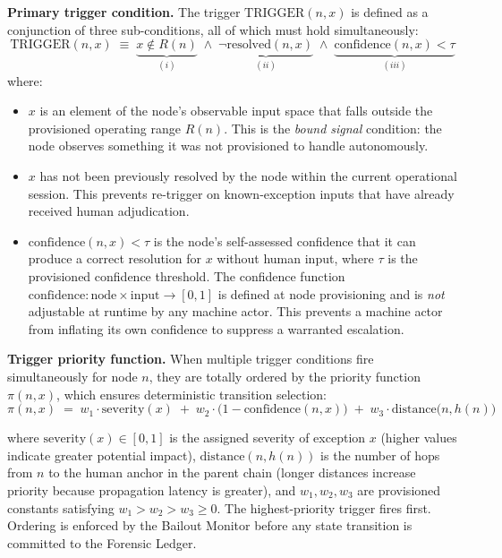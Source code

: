 \bigskip
\noindent\textbf{Primary trigger condition.} The trigger $\text{TRIGGER}(n, x)$ is defined as a conjunction of three sub-conditions, all of which must hold simultaneously:
\begin{equation}
\text{TRIGGER}(n, x) \;\equiv\; \underbrace{x \notin R(n)}_{(i)} \;\land\; \underbrace{\neg\text{resolved}(n, x)}_{(ii)} \;\land\; \underbrace{\text{confidence}(n, x) < \tau}_{(iii)} \tag{TC}
\end{equation}
where:

\begin{itemize}\itemsep=0pt
\item[(i)] $x$ is an element of the node's observable input space that falls outside the provisioned operating range $R(n)$. This is the \emph{bound signal} condition: the node observes something it was not provisioned to handle autonomously.

\item[(ii)] $x$ has not been previously resolved by the node within the current operational session. This prevents re-trigger on known-exception inputs that have already received human adjudication.

\item[(iii)] $\text{confidence}(n, x) < \tau$ is the node's self-assessed confidence that it can produce a correct resolution for $x$ without human input, where $\tau$ is the provisioned confidence threshold. The confidence function $\text{confidence} : \text{node} \times \text{input} \rightarrow [0, 1]$ is defined at node provisioning and is \emph{not} adjustable at runtime by any machine actor. This prevents a machine actor from inflating its own confidence to suppress a warranted escalation.
\end{itemize}

\bigskip
\noindent\textbf{Trigger priority function.} When multiple trigger conditions fire simultaneously for node $n$, they are totally ordered by the priority function $\pi(n, x)$, which ensures deterministic transition selection:
\begin{equation}
\pi(n, x) \;=\; w_1 \cdot \text{severity}(x) \;+\; w_2 \cdot \bigl(1 - \text{confidence}(n, x)\bigr) \;+\; w_3 \cdot \text{distance}\bigl(n, h(n)\bigr) \tag{PF}
\end{equation}

where $\text{severity}(x) \in [0, 1]$ is the assigned severity of exception $x$ (higher values indicate greater potential impact), $\text{distance}(n, h(n))$ is the number of hops from $n$ to the human anchor in the parent chain (longer distances increase priority because propagation latency is greater), and $w_1, w_2, w_3$ are provisioned constants satisfying $w_1 > w_2 > w_3 \geq 0$. The highest-priority trigger fires first. Ordering is enforced by the Bailout Monitor before any state transition is committed to the Forensic Ledger.

